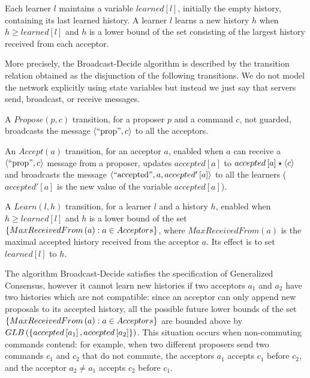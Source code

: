 \documentclass{llncs}
\begin{document}
Each learner $l$ maintains a variable $learned\left[ l \right]$, initially the empty history, containing its last learned history. A learner $l$
learns a new history $h$ when $h \geq learned\left[ l \right]$ and $h$ is a lower bound of the set consisting of the largest history received
from each acceptor.

More precisely, the Broadcast-Decide algorithm is described by the transition relation obtained as the disjunction of the
following transitions. We do not model the network explicitly using state variables but instead we just say that servers send, broadcast, or receive messages.

\begin{compactitem}

\item A $Propose\left( p,c \right)$ transition, for a proposer $p$ and a command $c$, not guarded, broadcasts the message $\left\langle\text{``prop''},c\right\rangle$ to all
the acceptors.

\item An $Accept\left( a \right)$ transition, for an acceptor $a$, enabled when $a$ can receive a $\left\langle\text{``prop''},c\right\rangle$ message from a proposer,
updates $accepted\left[ a \right]$ to $accepted\left[ a \right]\star \left\langle c\right\rangle$ and broadcasts the message $\left\langle\text{``accepted''}, a, accepted'\left[ a \right]\right\rangle$ to all the learners
($accepted'\left[ a \right]$ is the new value of the variable $accepted\left[ a \right]$).

\item A $Learn\left( l, h \right)$ transition, for a learner $l$ and a history $h$, enabled when $h \geq learned\left[ l \right]$ and $h$ is a lower
bound of the set $\left\{MaxReceivedFrom\left( a \right) : a \in Acceptors\right\}$, where $MaxReceivedFrom\left( a \right)$ is the maximal accepted history received
from the acceptor $a$.
 Its effect is to set $learned\left[ l \right]$ to $h$.

\end{compactitem}

The algorithm Broadcast-Decide satisfies the specification of Generalized Consensus, however it cannot learn new histories if two acceptors $a_1$ and $a_2$ have two histories which are not compatible: since an acceptor can only append new proposals to its accepted history, all the possible future lower bounds of the set $\left\{MaxReceivedFrom\left( a \right) : a \in Acceptors\right\}$ are bounded above by $GLB\left( \left\{accepted\left[ a_1 \right], accepted\left[ a_2 \right]\right\} \right)$.
This situation occurs when non-commuting commands contend: for example, when two different proposers send two commands $c_1$ and $c_2$ that do not commute, the acceptors $a_1$ accepts $c_1$ before $c_2$, and the acceptor $a_2 \neq a_1$ accepts $c_2$ before $c_1$.
\end{document}
